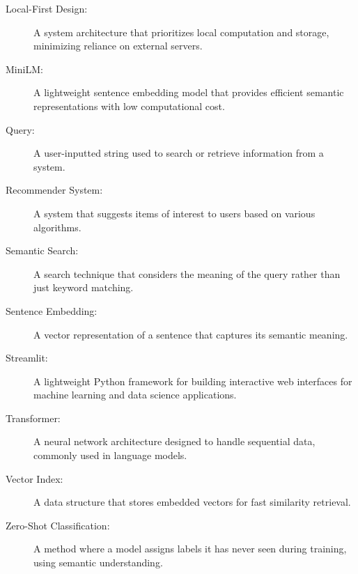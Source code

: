 \begin{description}
    \item[Local-First Design:] A system architecture that prioritizes local computation and storage, minimizing reliance on external servers.

    \item[MiniLM:] A lightweight sentence embedding model that provides efficient semantic representations with low computational cost.

    \item[Query:] A user-inputted string used to search or retrieve information from a system.

    \item[Recommender System:] A system that suggests items of interest to users based on various algorithms.

    \item[Semantic Search:] A search technique that considers the meaning of the query rather than just keyword matching.

    \item[Sentence Embedding:] A vector representation of a sentence that captures its semantic meaning.

    \item[Streamlit:] A lightweight Python framework for building interactive web interfaces for machine learning and data science applications.

    \item[Transformer:] A neural network architecture designed to handle sequential data, commonly used in language models.

    \item[Vector Index:] A data structure that stores embedded vectors for fast similarity retrieval.

    \item[Zero-Shot Classification:] A method where a model assigns labels it has never seen during training, using semantic understanding.
\end{description}
